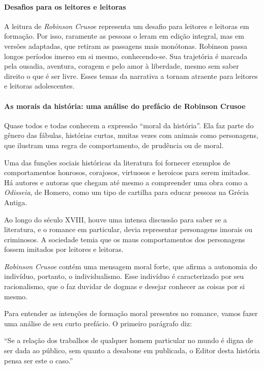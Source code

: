 \documentclass[12pt]{extarticle}
\begin{document}
\paragraph{Desafios para os leitores e leitoras}
A leitura de \emph{Robinson Crusoe} representa um desafio para leitores
e leitoras em formação. Por isso, raramente as pessoas o leram em edição
integral, mas em versões adaptadas, que retiram as passagens mais
monótonas. Robinson passa longos períodos imerso em si mesmo,
conhecendo-se. Sua trajetória é marcada pela ousadia, aventura, coragem
e pelo amor à liberdade, mesmo sem saber direito o que é ser livre.
Esses temas da narrativa a tornam atraente para leitores e leitoras
adolescentes.

\paragraph{As morais da história: uma análise do prefácio de Robinson Crusoe}
Quase todos e todas conhecem a expressão ``moral da história''. Ela faz
parte do gênero das fábulas, histórias curtas, muitas vezes com animais
como personagens, que ilustram uma regra de comportamento, de prudência
ou de moral.

Uma das funções sociais históricas da literatura foi fornecer exemplos
de comportamentos honrosos, corajosos, virtuosos e heroicos para serem
imitados. Há autores e autoras que chegam até mesmo a compreender uma
obra como a \emph{Odisseia}, de Homero, como um tipo de cartilha para
educar pessoas na Grécia Antiga.

Ao longo do século XVIII, houve uma intensa discussão para saber se a
literatura, e o romance em particular, devia representar personagens
imorais ou criminosos. A sociedade temia que os maus comportamentos dos
personagens fossem imitados por leitores e leitoras.

\emph{Robinson Crusoe} contém uma mensagem moral forte, que afirma a
autonomia do indivíduo, portanto, o individualismo. Esse indivíduo é
caracterizado por seu racionalismo, que o faz duvidar de dogmas e
desejar conhecer as coisas por si mesmo.

Para entender as intenções de formação moral presentes no romance, vamos
fazer uma análise de seu curto prefácio. O primeiro parágrafo diz:

``Se a relação dos trabalhos de qualquer homem particular no mundo é
digna de ser dada ao público, sem quanto a desabone em publicada, o
Editor desta história pensa ser este o caso.''
\end{document}
